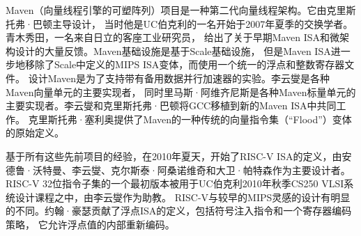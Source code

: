 Maven（向量线程引擎的可塑阵列）项目是一种第二代向量线程架构。它由克里斯托弗·巴顿主导设计，
当时他是UC伯克利的一名开始于2007年夏季的交换学者。青木秀田，一名来自日立的客座工业研究员，
给出了关于早期Maven ISA和微架构设计的大量反馈。Maven基础设施是基于Scale基础设施，
但是Maven ISA进一步地移除了Scale中定义的MIPS ISA变体，而使用一个统一的浮点和整数寄存器文件。
设计Maven是为了支持带有备用数据并行加速器的实验。李云燮是各种Maven向量单元的主要实现者，
同时里马斯·阿维齐尼斯是各种Maven标量单元的主要实现者。李云燮和克里斯托弗·巴顿将GCC移植到新的Maven ISA中共同工作。
克里斯托弗·塞利奥提供了Maven的一种传统的向量指令集（“Flood”）变体的原始定义。

基于所有这些先前项目的经验，在2010年夏天，开始了RISC-V ISA的定义，由安德鲁·沃特曼、李云燮、克尔斯泰·阿桑诺维奇和大卫·帕特森作为主要设计者。
RISC-V 32位指令子集的一个最初版本被用于UC伯克利2010年秋季CS250 VLSI系统设计课程之中，由李云燮作为助教。
RISC-V与较早的MIPS灵感的设计有明显的不同。约翰·豪瑟贡献了浮点ISA的定义，包括符号注入指令和一个寄存器编码策略，
它允许浮点值的内部重新编码。

